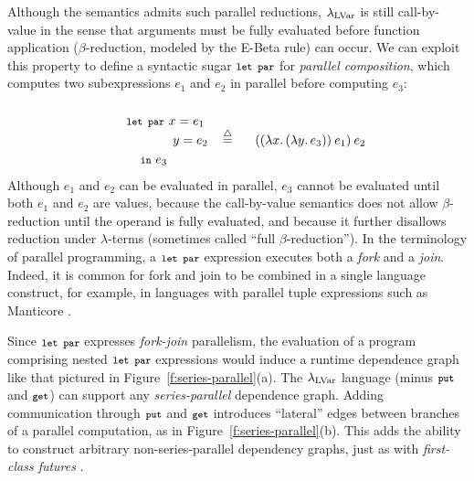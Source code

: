 Although the semantics admits such parallel
reductions, $\textup{\ensuremath{\lambda_{\textrm{LVar}}}}$ is still call-by-value in the sense that
arguments must be fully evaluated before function
application ($\beta$-reduction, modeled by the {\sc E-Beta} rule) can occur.  We can exploit this
property to define a syntactic sugar $\mbox{\footnotesize \texttt{\mbox{\footnotesize \texttt{let}}~\mbox{\footnotesize \texttt{par}}}}$ for {\em parallel composition}, which 
computes two subexpressions $e_1$ and $e_2$ in
parallel before computing $e_3$:
\begin{displaymath}
\begin{minipage}[b]{0.8in}
  \begin{equation*}
\begin{split}
& \LETPAR ~x = e_1 \\ 
& \letparspace ~y = e_2 \\
& \letspace \IN~e_3 
\end{split}
\end{equation*}
\end{minipage}
\begin{minipage}[b]{0.6in}
\centering
$\defeq$
\end{minipage}
\begin{minipage}[b]{1in}
\begin{equation*}
  \app{(\app{(\lam{x}{(\lam{y}{e_3})})}{e_1})}{e_2}
\end{equation*}
\end{minipage}
\end{displaymath}
\noindent Although $e_1$ and $e_2$ can be evaluated in parallel, $e_3$
cannot be evaluated until both $e_1$ and $e_2$ are values, because the
call-by-value semantics does not allow $\beta$-reduction until the
operand is fully evaluated, and because it further disallows reduction
under $\lambda$-terms (sometimes called ``full $\beta$-reduction'').
In the terminology of parallel programming, a $\mbox{\footnotesize \texttt{\mbox{\footnotesize \texttt{let}}~\mbox{\footnotesize \texttt{par}}}}$ expression
executes both a {\em fork} and a {\em join}.  Indeed, it is common for
fork and join to be combined in a single language construct, for
example, in languages with parallel tuple expressions such as
Manticore \cite{manticore_parallel_tuples}.

Since $\mbox{\footnotesize \texttt{\mbox{\footnotesize \texttt{let}}~\mbox{\footnotesize \texttt{par}}}}$ expresses {\em fork-join}
parallelism, the evaluation of a program comprising nested $\mbox{\footnotesize \texttt{\mbox{\footnotesize \texttt{let}}~\mbox{\footnotesize \texttt{par}}}}$
expressions would induce a runtime dependence graph like that pictured 
in
Figure~\ref{f:series-parallel}(a).  
The $\textup{\ensuremath{\lambda_{\textrm{LVar}}}}$ language (minus $\mbox{\footnotesize \texttt{put}}$ and $\mbox{\footnotesize \texttt{get}}$) can
support any {\em series-parallel} dependence graph.  Adding
communication through $\mbox{\footnotesize \texttt{put}}$ and $\mbox{\footnotesize \texttt{get}}$ introduces ``lateral'' edges
between branches of a parallel computation,
as in
Figure~\ref{f:series-parallel}(b).  This adds the ability to
construct arbitrary non-series-parallel dependency graphs, just as with 
 {\em first-class
  futures} \cite{beyond-nested-workstealing}.




